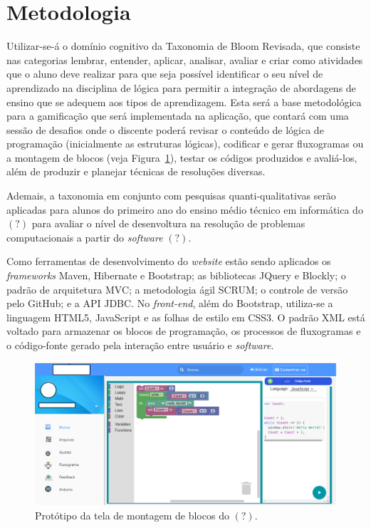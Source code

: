 \documentclass[12pt]{article}
\begin{document}
\section{Metodologia} 
Utilizar-se-á o domínio cognitivo da Taxonomia de Bloom Revisada, que consiste nas categorias lembrar, entender, aplicar, analisar, avaliar e criar \cite{ANDERSON:2001} como atividades que o aluno deve realizar para que seja possível identificar o seu nível de aprendizado na disciplina de lógica para permitir a integração de abordagens de ensino que se adequem aos tipos de aprendizagem. Esta será a base metodológica para a gamificação que será implementada na aplicação, que contará com uma sessão de desafios onde o discente poderá revisar o conteúdo de lógica de programação (inicialmente as estruturas lógicas), codificar e gerar fluxogramas ou a montagem de blocos (veja Figura~\ref{fig2}), testar os códigos produzidos e avaliá-los, além de produzir e planejar técnicas de resoluções diversas.
\par Ademais, a taxonomia em conjunto com pesquisas quanti-qualitativas serão aplicadas para alunos do primeiro ano do ensino médio técnico em informática do $(?)$ para avaliar o nível de desenvoltura na resolução de problemas computacionais a partir do \textit{software} $(?)$.
\par Como ferramentas de desenvolvimento do \textit{website} estão sendo aplicados os \textit{frameworks} Maven, Hibernate e Bootstrap; as bibliotecas JQuery e Blockly; o padrão de arquitetura MVC; a metodologia ágil SCRUM; o controle de versão pelo GitHub; e a API JDBC. No \textit{front-end}, além do Bootstrap, utiliza-se a linguagem HTML5, JavaScript e as folhas de estilo em CSS3. O padrão XML está voltado para armazenar os blocos de programação, os processos de fluxogramas e o código-fonte gerado pela interação entre usuário e \textit{software}. 

	\begin{figure}[h]
		\centering
		\includegraphics[scale=0.3]{bloc.png}
		\caption{Protótipo da tela de montagem de blocos do $(?)$.}
		\label{fig2}
	\end{figure}
\end{document}
